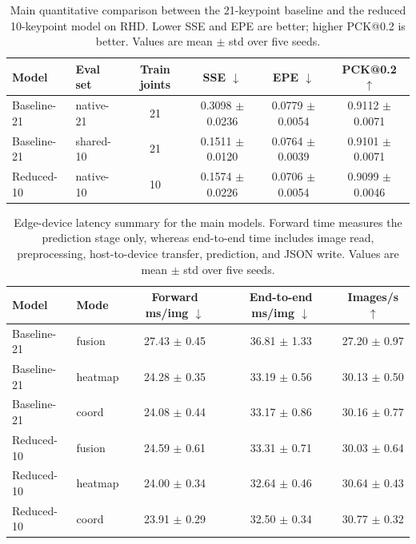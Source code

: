 \documentclass[10pt,letterpaper]{article}
\begin{document}
\begin{table}[H]
\centering
\footnotesize
\caption{Main quantitative comparison between the 21-keypoint baseline and the reduced 10-keypoint model on RHD. Lower SSE and EPE are better; higher PCK@0.2 is better. Values are mean $\pm$ std over five seeds.}
\label{tab:main_accuracy}
\begin{tabular}{llcccc}
\toprule
Model & Eval set & Train joints & SSE $\downarrow$ & EPE $\downarrow$ & PCK@0.2 $\uparrow$ \\
\midrule
Baseline-21 & native-21 & 21 & 0.3098 $\pm$ 0.0236 & 0.0779 $\pm$ 0.0054 & 0.9112 $\pm$ 0.0071 \\
Baseline-21 & shared-10 & 21 & 0.1511 $\pm$ 0.0120 & 0.0764 $\pm$ 0.0039 & 0.9101 $\pm$ 0.0071 \\
Reduced-10 & native-10 & 10 & 0.1574 $\pm$ 0.0226 & 0.0706 $\pm$ 0.0054 & 0.9099 $\pm$ 0.0046 \\
\bottomrule
\end{tabular}
\end{table}

\begin{table}[H]
\centering
\footnotesize
\caption{Edge-device latency summary for the main models. Forward time measures the prediction stage only, whereas end-to-end time includes image read, preprocessing, host-to-device transfer, prediction, and JSON write. Values are mean $\pm$ std over five seeds.}
\label{tab:latency}
\begin{tabular}{llccc}
\toprule
Model & Mode & Forward ms/img $\downarrow$ & End-to-end ms/img $\downarrow$ & Images/s $\uparrow$ \\
\midrule
Baseline-21 & fusion & 27.43 $\pm$ 0.45 & 36.81 $\pm$ 1.33 & 27.20 $\pm$ 0.97 \\
Baseline-21 & heatmap & 24.28 $\pm$ 0.35 & 33.19 $\pm$ 0.56 & 30.13 $\pm$ 0.50 \\
Baseline-21 & coord & 24.08 $\pm$ 0.44 & 33.17 $\pm$ 0.86 & 30.16 $\pm$ 0.77 \\
Reduced-10 & fusion & 24.59 $\pm$ 0.61 & 33.31 $\pm$ 0.71 & 30.03 $\pm$ 0.64 \\
Reduced-10 & heatmap & 24.00 $\pm$ 0.34 & 32.64 $\pm$ 0.46 & 30.64 $\pm$ 0.43 \\
Reduced-10 & coord & 23.91 $\pm$ 0.29 & 32.50 $\pm$ 0.34 & 30.77 $\pm$ 0.32 \\
\bottomrule
\end{tabular}
\end{table}
\end{document}
